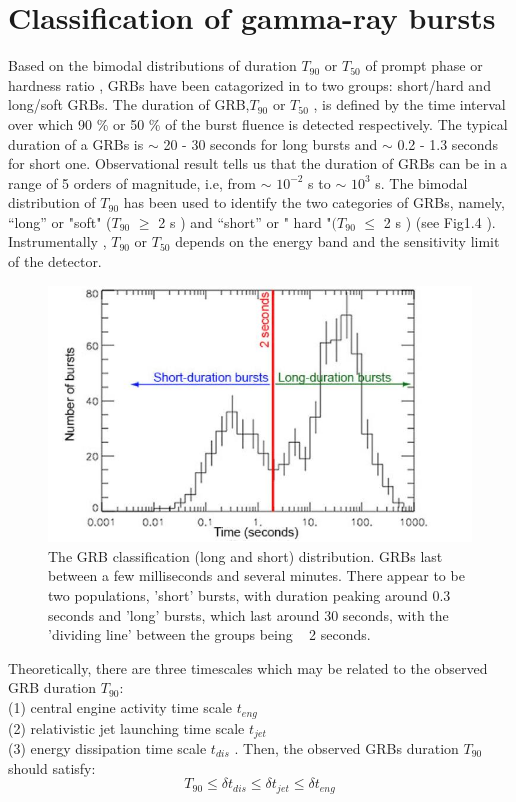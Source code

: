 \section{Classification of gamma-ray bursts}
Based on the bimodal distributions of duration $ T_{90}$ or $ T_{50}$ of prompt phase or hardness ratio , GRBs have been catagorized in to two groups: short/hard and long/soft GRBs. The duration of GRB,$ T_{90} $ or $ T_{50}$  , is defined by the time interval over which 90 \%  or  50 \%  of the burst fluence is detected respectively. The typical duration of a GRBs is $\sim $ 20 - 30  seconds for long bursts and $\sim $ 0.2 - 1.3 seconds for short one. Observational result tells us that the duration of GRBs can be in a range of 5 orders of magnitude, i.e, from $\sim $ $ 10^{-2} $ s  to $\sim $ $ 10^{3} $ s. The bimodal distribution of $ T_{90} $ has been used to identify the two categories of GRBs, namely, “long” or "soft" ($ T_{90}$ $\geqslant $ 2  s ) and “short” or " hard "$( T_{90}$   $\leqslant$ 2 s ) (see Fig1.4 ). Instrumentally ,  $T_{90}$  or  $T_{50} $ depends on the energy band and the sensitivity limit of the detector.
\begin{figure}[h]
\begin{center}
\includegraphics[scale=0.4]{Figures/fig4.png}
\caption{The GRB classification (long and short) distribution. GRBs last between a few milliseconds and several minutes. There appear to be two populations, 'short' bursts, with duration peaking around 0.3 seconds and 'long' bursts, which last around 30 seconds, with the 'dividing line' between the groups being ~ 2 seconds. }
\end{center}
\end{figure} 
Theoretically, there are three timescales which may be related to the observed GRB duration $ T_{90} $:\\
(1) central engine activity time scale $t_{eng}$\\
(2) relativistic jet launching time scale $t_{jet} $\\
(3) energy dissipation time scale $t_{dis}$ . Then, the observed GRBs duration $  T_{90}$ should satisfy: \citep{5}
\begin{equation}
T_{90} \leq \delta  t_{dis} \leq\delta t_{jet} \leq \delta t_{eng} 
\end{equation}

